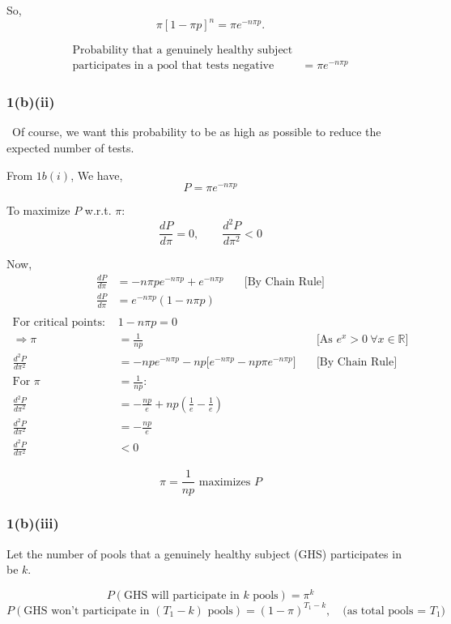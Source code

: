 \documentclass[12pt]{article}
\begin{document}
So,
\[
\pi [1 - \pi p]^n = \pi e^{-n\pi p}.
\]

\[
\boxed{
\begin{aligned}
\text{Probability that a genuinely healthy subject} \\
\text{participates in a pool that tests negative } 
&= \pi e^{-n\pi p}
\end{aligned}
}
\]

\subsubsection{1(b)(ii)}\
Of course, we want this probability to be as high as possible to reduce the expected number of tests.

From $1b(i)$, We have,
\[
P = \pi e^{-n\pi p}
\]

To maximize \( P \) w.r.t. \( \pi \):
\[
\frac{dP}{d\pi} = 0, \qquad \frac{d^2P}{d\pi^2} < 0
\]

Now,
\begin{align*}
\frac{dP}{d\pi} &= -n\pi p e^{-n\pi p} + e^{-n\pi p} \quad &\text{[By Chain Rule]} \\
\frac{dP}{d\pi} &= e^{-n\pi p} (1 - n\pi p) \\[6pt]
\end{align*}
\begin{align*}
    \text{For critical points: } & 1 - n\pi p = 0 \\
\Rightarrow \pi &= \frac{1}{np} \quad &\text{[As $e^x > 0 \ \forall x \in \mathbb{R}$]} \\[10pt]
\frac{d^2P}{d\pi^2} &= -np e^{-n\pi p} - np \Big[e^{-n\pi p}-np\pi e^{-n\pi p}\Big] \quad &\text{[By Chain Rule]} \\[8pt]
\text{For } \pi &= \frac{1}{np}: \\
\frac{d^2P}{d\pi^2} &= -\frac{np}{e} + np \left(\frac{1}{e}-\frac{1}{e}\right) \\
\frac{d^2P}{d\pi^2} &= -\frac{np}{e} \\
\frac{d^2P}{d\pi^2} &< 0
\end{align*}

\[
\boxed{\pi = \frac{1}{np} \text{ maximizes } P}
\]
\subsubsection{1(b)(iii)}
Let the number of pools that a genuinely healthy subject (GHS) participates in be $k$.

\[
P(\text{GHS will participate in $k$ pools}) = \pi^k
\]
\[
P(\text{GHS won't participate in $(T_1-k)$ pools}) = (1-\pi)^{T_1-k}, 
\quad \text{(as total pools = $T_1$)}
\]
\end{document}

